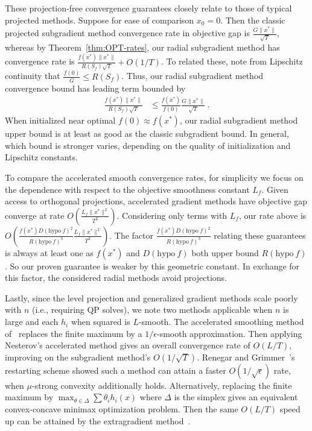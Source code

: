 \documentclass[sn-mathphys,Numbered]{sn-jnl}%
\begin{document}
These projection-free convergence guarantees closely relate to those of typical projected methods. Suppose for ease of comparison $x_0=0$. Then the classic projected subgradient method convergence rate in objective gap is $\frac{G\|x^*\|}{\sqrt{T}}$, whereas by Theorem~\ref{thm:OPT-rates}, our radial subgradient method has convergence rate is $\frac{f(x^*)\|x^*\|}{R(S_f)\sqrt{T}} + O(1/T)$. To related these, note from Lipschitz continuity that $\frac{f(0)}{G} \leq R(S_f)$. Thus, our radial subgradient method convergence bound has leading term bounded by
\begin{align*}
    \frac{f(x^*)\|x^*\|}{R(S_f)\sqrt{T}}
    &\leq \frac{f(x^*)}{f(0)}\frac{G\|x^*\|}{\sqrt{T}} \ .
\end{align*}
When initialized near optimal $f(0) \approx f(x^*)$, our radial subgradient method upper bound is at least as good as the classic subgradient bound. In general, which bound is stronger varies, depending on the quality of initialization and Lipschitz constants.

To compare the accelerated smooth convergence rates, for simplicity we focus on the dependence with respect to the objective smoothness constant $L_f$. Given access to orthogonal projections, accelerated gradient methods have objective gap converge at rate $O\left(\frac{L_{f} \|x^*\|^2}{T^2}\right)$. Considering only terms with $L_f$, our rate above is $O\left(\frac{f(x^*)D(\mathrm{hypo\ }f)^2}{R(\mathrm{hypo\ } f)^3}\frac{L_{f}  \|x^*\|^2}{T^2}\right)$. 
The factor $\frac{f(x^*)D(\mathrm{hypo\ }f)^2}{R(\mathrm{hypo\ } f)^3}$ relating these guarantees is always at least one as $f(x^*)$ and $D(\mathrm{hypo\ }f)$ both upper bound $R(\mathrm{hypo\ } f)$. So our proven guarantee is weaker by this geometric constant. In exchange for this factor, the considered radial methods avoid projections.


Lastly, since the level projection and generalized gradient methods scale poorly with $n$ (i.e., requiring QP solves), we note two methods applicable when $n$ is large and each $h_i$ when squared is $L$-smooth. The accelerated smoothing method of~\cite{Nesterov2005,Beck2012} replaces the finite maximum by a $1/\epsilon$-smooth approximation. Then applying Nesterov's accelerated method gives an overall convergence rate of $O(L/T)$, improving on the subgradient method's $O(1/\sqrt{T})$. Renegar and Grimmer~\cite{RenegarGrimmer2022}'s restarting scheme showed such a method can attain a faster $O(1/\sqrt{\epsilon})$ rate, when $\mu$-strong convexity additionally holds. Alternatively, replacing the finite maximum by $\max_{\theta\in \Delta} \sum \theta_i h_i(x)$ where $\Delta$ is the simplex gives an equivalent convex-concave minimax optimization problem. Then the same $O(L/T)$ speed up can be attained by the extragradient method~\cite{Nemirovski2004}.
\end{document}
